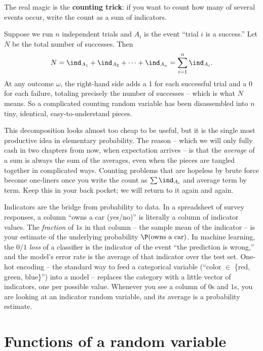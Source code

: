 The real magic is the \textbf{counting trick}: if you want to count how many of several
events occur, write the count as a sum of indicators.

\begin{example}
\label{ch06:ex-counting-indicators}
Suppose we run $n$ independent trials and $A_i$ is the event ``trial $i$ is a
success.'' Let $N$ be the total number of successes. Then
\[
  N = \ind_{A_1} + \ind_{A_2} + \cdots + \ind_{A_n} = \sum_{i=1}^n \ind_{A_i}.
\]
At any outcome $\omega$, the right-hand side adds a $1$ for each successful trial and a
$0$ for each failure, totaling precisely the number of successes -- which is what $N$
means. So a complicated counting random variable has been disassembled into $n$ tiny,
identical, easy-to-understand pieces.
\end{example}

This decomposition looks almost too cheap to be useful, but it is the single most
productive idea in elementary probability. The reason -- which we will only fully cash
in two chapters from now, when expectation arrives -- is that the \emph{average} of a
sum is always the sum of the averages, even when the pieces are tangled together in
complicated ways. Counting problems that are hopeless by brute force become one-liners
once you write the count as $\sum \ind_{A_i}$ and average term by term. Keep this in
your back pocket; we will return to it again and again.

\begin{applicationbox}
Indicators are the bridge from probability to data. In a spreadsheet of survey
responses, a column ``owns a car (yes/no)'' is literally a column of indicator values.
The \emph{fraction} of $1$s in that column -- the sample mean of the indicator -- is
your estimate of the underlying probability $\P(\text{owns a car})$. In machine
learning, the $0/1$ \emph{loss} of a classifier is the indicator of the event ``the
prediction is wrong,'' and the model's error rate is the average of that indicator
over the test set. One-hot encoding -- the standard way to feed a categorical variable
(``color $\in$ \{red, green, blue\}'') into a model -- replaces the category with a
little vector of indicators, one per possible value. Whenever you see a column of $0$s
and $1$s, you are looking at an indicator random variable, and its average is a
probability estimate.
\end{applicationbox}

\section{Functions of a random variable}
\label{ch06:functions-of-rv}


